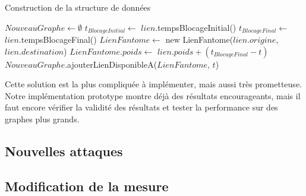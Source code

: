 \begin{algorithm}[H]
\caption{Construction de la structure de données}
\begin{algorithmic}
\State $NouveauGraphe \gets \emptyset$
    \State $t_{BlocageInitial} \gets$ $lien$.tempsBlocageInitial()
    \State $t_{BlocageFinal} \gets$ $lien$.tempsBlocageFinal()
        \State $LienFantome \gets$ new LienFantome($lien.origine$, $lien.destination$)
        \State $LienFantome.poids \gets$ $lien.poids + (t_{BlocageFinal} - t)$
        \State $NouveauGraphe$.ajouterLienDisponibleA($LienFantome$, $t$)
    \EndFor
\EndFor
\end{algorithmic}
\end{algorithm}

Cette solution est la plus compliquée à implémenter, mais aussi très prometteuse.
Notre implémentation prototype montre déjà des résultats encourageants, mais il faut encore vérifier la validité des résultats et tester la performance sur des graphes plus grands.

\subsection{Nouvelles attaques}\label{subsec:nouvelles_attaques}

\subsection{Modification de la mesure}